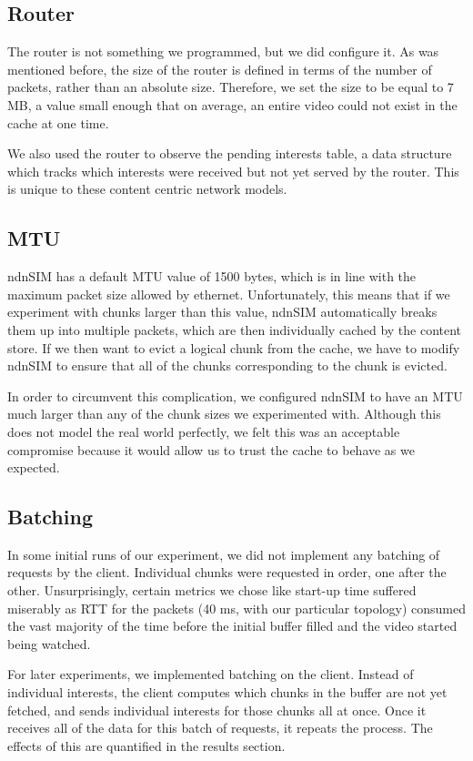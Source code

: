 \subsection{Router} \label{sec:router}

The router is not something we programmed, but we did configure it. As was
mentioned before, the size of the router is defined in terms of the number of
packets, rather than an absolute size. Therefore, we set the size to be equal to
7 MB, a value small enough that on average, an entire video could not exist in
the cache at one time.

We also used the router to observe the pending interests table, a data structure
which tracks which interests were received but not yet served by the router.
This is unique to these content centric network models.

\subsection{MTU} \label{sec:mtu}

ndnSIM has a default MTU value of 1500 bytes, which is in line with the maximum
packet size allowed by ethernet. Unfortunately, this means that if we experiment
with chunks larger than this value, ndnSIM automatically breaks them up into
multiple packets, which are then individually cached by the content store. If we
then want to evict a logical chunk from the cache, we have to modify ndnSIM to
ensure that all of the chunks corresponding to the chunk is evicted. 

In order to circumvent this complication, we configured ndnSIM to have an MTU
much larger than any of the chunk sizes we experimented with. Although this does
not model the real world perfectly, we felt this was an acceptable compromise
because it would allow us to trust the cache to behave as we expected.

\subsection{Batching} \label{sec:batching}

In some initial runs of our experiment, we did not implement any batching of
requests by the client. Individual chunks were requested in order, one after the
other. Unsurprisingly, certain metrics we chose like start-up time suffered
miserably as RTT for the packets (40 ms, with our particular topology) consumed
the vast majority of the time before the initial buffer filled and the video
started being watched.

For later experiments, we implemented batching on the client. Instead of
individual interests, the client computes which chunks in the buffer are not yet
fetched, and sends individual interests for those chunks all at once. Once it
receives all of the data for this batch of requests, it repeats the process. The
effects of this are quantified in the results section.
